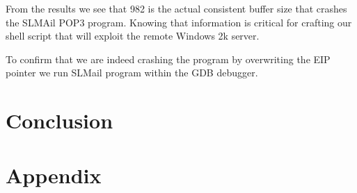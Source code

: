 \documentclass[12pt]{article}
\begin{document}
From the results we see that 982 is the actual consistent buffer size that 
crashes the SLMAil POP3 program. Knowing that information is critical for
crafting our shell script that will exploit the remote Windows 2k server.

To confirm that we are indeed crashing the program by overwriting the EIP
pointer we run SLMail program within the GDB debugger. 

\section{Conclusion}
\label{sect:conclusion}


\nocite{*}



\section*{Appendix}
\label{sect:appendix}

\end{document}
